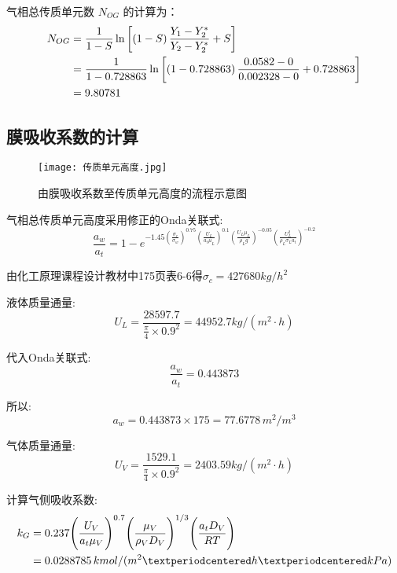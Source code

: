 气相总传质单元数 \( N_{OG} \) 的计算为：
\begin{align}
	N_{OG}
	&= \frac{1}{1-S} \ln \left[\left(1-S\right)\frac{Y_1 - Y_2^{*}}{Y_2 - Y_2^{*}} + S\right] \\
	&= \frac{1}{1-0.728863} \ln \left[\left(1-0.728863\right)\frac{0.0582-0}{0.002328-0}+0.728863\right] \notag \\
	&= 9.80781  \notag
\end{align}

\subsection{膜吸收系数的计算}

\begin{figure}[ht]
	\centering
	\texttt{[image: 传质单元高度.jpg]}
	\caption{由膜吸收系数至传质单元高度的流程示意图}
\end{figure}

气相总传质单元高度采用修正的Onda关联式:
\begin{equation}
	\frac{a_{w}}{a_{t}} = 1-e^{-1.45\left(\frac{\sigma_c}{\sigma_w}\right)^{0.75}\left(\frac{U_{L}}{a_{t}\mu_{L}}\right)^{0.1}\left(\frac{U_{L}\mu_{L}}{\rho_{L}g}\right)^{-0.05}\left(\frac{U_{L}^2}{\rho_{L}\sigma_L a_{t}}\right)^{-0.2}}
\end{equation}

由化工原理课程设计教材中175页表6-6得$\sigma_{c} = 427680kg/h^{2}$

液体质量通量:
\begin{equation}
	U_{L} = \frac{28597.7}{\frac{\pi}{4} \times 0.9 ^2} = 44952.7 kg/(m^2·h)
\end{equation}

代入Onda关联式:
\begin{equation}
	\frac{a_{w}}{a_{t}} = 0.443873
\end{equation}

所以:
\begin{equation}
	a_{w} = 0.443873 \times 175 = 77.6778 \, m^2/m^3
\end{equation}

气体质量通量:
\begin{equation}
	U_{V} = \frac{1529.1}{\frac{\pi}{4} \times 0.9 ^2} = 2403.59 kg/(m^2·h)
\end{equation}

计算气侧吸收系数:
\begin{align}
	k_{G}
	&= 0.237\Bigg(\frac{U_{V}}{a_{t}\mu_{V}}\Bigg)^{0.7}\Bigg(\frac{\mu_{V}}{\rho_{V}D_{V}}\Bigg)^{1/3}\Bigg(\frac{a_{t}D_{V}}{RT}\Bigg) \\
	&=
	0.0288785 \, kmol/(m^2·h·kPa) \notag
\end{align}

